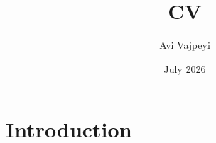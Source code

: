 \documentclass{article}
\title{CV}
\author{Avi Vajpeyi}
\date{July 2026}
\begin{document}
\maketitle

\section{Introduction}
\end{document}
